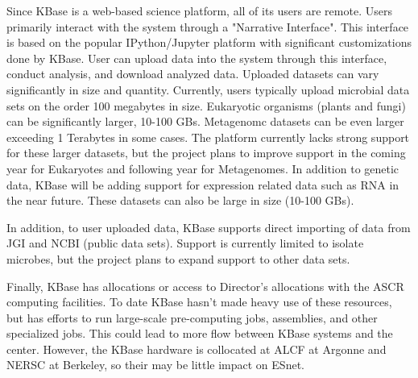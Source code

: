 \documentclass[10pt,a4paper]{report}
\begin{document}
Since KBase is a web-based science platform, all of its users are remote.  Users primarily interact with the system through a "Narrative Interface".  This interface is based on the popular IPython/Jupyter platform with significant customizations done by KBase.  User can upload  data into the system through this interface, conduct analysis, and download analyzed data.  Uploaded datasets can vary significantly in size and quantity.  Currently, users typically upload microbial data sets on the order 100 megabytes in size.  Eukaryotic organisms (plants and fungi) can be significantly larger, 10-100 GBs.  Metagenomc datasets can be even larger exceeding 1 Terabytes in some cases.  The platform currently lacks strong support for these larger datasets, but the project plans to improve support in the coming year for Eukaryotes and following year for Metagenomes.  In addition to genetic data, KBase will be adding support for expression related data such as RNA in the near future.  These datasets can also be large in size (10-100 GBs).

In addition, to user uploaded data, KBase supports direct importing of data from JGI and NCBI (public data sets).  Support is currently limited to isolate microbes, but the project plans to expand support to other data sets.

Finally, KBase has allocations or access to Director's allocations with the ASCR computing facilities.  To date  KBase hasn't made heavy use of these resources, but has efforts to run large-scale pre-computing jobs, assemblies, and other specialized jobs.  This could lead to more flow between KBase systems and the center.  However, the KBase hardware is collocated at ALCF at Argonne and NERSC at Berkeley, so their may be little impact on ESnet.
\end{document}
